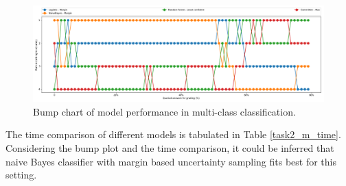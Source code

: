  \begin{figure}[h]
 	\centering
 	\includegraphics[scale=0.3]{images/task2_rank}
 	\caption{Bump chart of model performance in multi-class classification.}
 	\label{t2_m_bump}
 \end{figure}
 
  
 
 The time comparison of different models is tabulated in Table \ref{task2_m_time}. Considering the bump plot and the time comparison, it could be inferred that naive Bayes classifier with margin based uncertainty sampling fits best for this setting.

